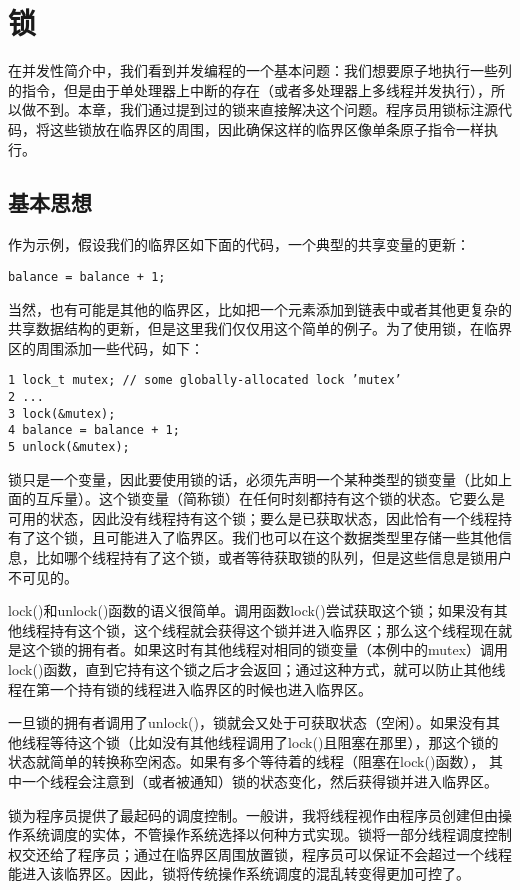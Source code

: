 \chapter{锁}
\thispagestyle{empty}

在并发性简介中，我们看到并发编程的一个基本问题：我们想要原子地执行一些列的指令，但是由于单处理器上中断的存在（或者多处理器上多线程并发执行），所以做不到。本章，我们通过提到过的锁来直接解决这个问题。程序员用锁标注源代码，将这些锁放在临界区的周围，因此确保这样的临界区像单条原子指令一样执行。

\section{基本思想}
作为示例，假设我们的临界区如下面的代码，一个典型的共享变量的更新：
\begin{verbatim}
balance = balance + 1;
\end{verbatim}
当然，也有可能是其他的临界区，比如把一个元素添加到链表中或者其他更复杂的共享数据结构的更新，但是这里我们仅仅用这个简单的例子。为了使用锁，在临界区的周围添加一些代码，如下：
\begin{verbatim}
1 lock_t mutex; // some globally-allocated lock ’mutex’
2 ...
3 lock(&mutex);
4 balance = balance + 1;
5 unlock(&mutex);
\end{verbatim}

锁只是一个变量，因此要使用锁的话，必须先声明一个某种类型的锁变量（比如上面的互斥量）。这个锁变量（简称锁）在任何时刻都持有这个锁的状态。它要么是可用的状态，因此没有线程持有这个锁；要么是已获取状态，因此恰有一个线程持有了这个锁，且可能进入了临界区。我们也可以在这个数据类型里存储一些其他信息，比如哪个线程持有了这个锁，或者等待获取锁的队列，但是这些信息是锁用户不可见的。

lock()和unlock()函数的语义很简单。调用函数lock()尝试获取这个锁；如果没有其他线程持有这个锁，这个线程就会获得这个锁并进入临界区；那么这个线程现在就是这个锁的拥有者。如果这时有其他线程对相同的锁变量（本例中的mutex）调用lock()函数，直到它持有这个锁之后才会返回；通过这种方式，就可以防止其他线程在第一个持有锁的线程进入临界区的时候也进入临界区。

一旦锁的拥有者调用了unlock()，锁就会又处于可获取状态（空闲）。如果没有其他线程等待这个锁（比如没有其他线程调用了lock()且阻塞在那里），那这个锁的状态就简单的转换称空闲态。如果有多个等待着的线程（阻塞在lock()函数）， 其中一个线程会注意到（或者被通知）锁的状态变化，然后获得锁并进入临界区。

锁为程序员提供了最起码的调度控制。一般讲，我将线程视作由程序员创建但由操作系统调度的实体，不管操作系统选择以何种方式实现。锁将一部分线程调度控制权交还给了程序员；通过在临界区周围放置锁，程序员可以保证不会超过一个线程能进入该临界区。因此，锁将传统操作系统调度的混乱转变得更加可控了。


